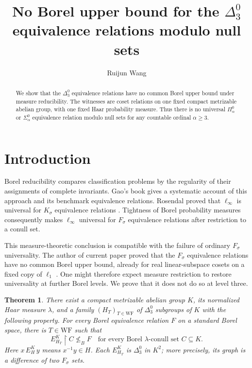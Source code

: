 \documentclass[11pt]{article}
\title{No Borel upper bound for the $\Delta^0_3$ equivalence relations modulo null sets}
\author{Ruijun Wang}
\date{}
\newtheorem{theorem}{Theorem}[section]
\theoremstyle{definition}
\theoremstyle{remark}
\newcommand{\WF}{\mathrm{WF}}
\begin{document}
\maketitle
\begin{abstract}
We show that the $\Delta^0_3$ equivalence relations have no common Borel upper bound under measure reducibility. The witnesses are coset relations on one fixed compact metrizable abelian group, with one fixed Haar probability measure. Thus there is no universal $\Pi^0_\alpha$ or $\Sigma^0_\alpha$ equivalence relation modulo null sets for any countable ordinal $\alpha\geq3$.
\end{abstract}

\section{Introduction}
Borel reducibility compares classification problems by the regularity of
their assignments of complete invariants. Gao's book \cite{Gao} gives a
systematic account of this approach and its benchmark equivalence relations.
Rosendal proved that $\ell_\infty$ is universal for $K_\sigma$ equivalence
relations \cite[Theorem 17 and Proposition 19]{Rosendal}. Tightness of Borel
probability measures consequently makes $\ell_\infty$ universal for
$F_\sigma$ equivalence relations after restriction to a conull set.

This measure-theoretic conclusion is compatible with the failure of ordinary
$F_\sigma$ universality. The author of current paper proved that the $F_\sigma$ equivalence relations
have no common Borel upper bound, already for real linear-subspace cosets on
a fixed copy of $\ell_1$ \cite{Wang}. One might therefore expect measure
restriction to restore universality at further Borel levels. We prove that
it does not do so at level three.

\begin{theorem}\label{thm:main}
There exist a compact metrizable abelian group $K$, its normalized Haar
measure $\lambda$, and a family $(H_T)_{T\in\WF}$ of $\Delta^0_3$ subgroups
of $K$ with the following property. For every Borel equivalence relation $F$
on a standard Borel space, there is $T\in\WF$ such that
\[
 E_{H_T}^K\mathbin{\upharpoonright}C\not\leq_B F
 \quad\text{for every Borel $\lambda$-conull set }C\subseteq K.
\]
Here $x\,E_H^K\,y$ means $x^{-1}y\in H$. Each $E_{H_T}^K$ is
$\Delta^0_3$ in $K^2$; more precisely, its graph is a difference of two
$F_\sigma$ sets.
\end{theorem}
\end{document}
